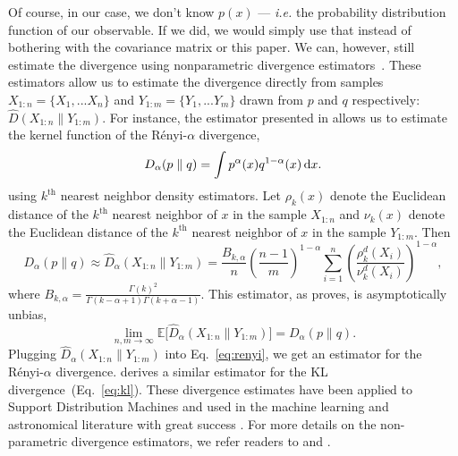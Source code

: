 \documentclass[12pt, letterpaper, preprint]{aastex}
\newcommand{\beq}{\begin{equation}}
\newcommand{\eeq}{\end{equation}}
\begin{document}
Of course, in our case, we don't know $p(x)$ --- \emph{i.e.} the probability 
distribution function of our observable. If we did, we would simply use that 
instead of bothering with the covariance matrix or this paper. We can, however, 
still estimate the divergence using nonparametric divergence estimators~\citep{wang2009, poczos2012, krishnamurthy2014}. 
These estimators allow us to estimate the divergence directly from 
samples $X_{1:n} = \{ X_1, ... X_n \}$ and $Y_{1:m} = \{ Y_1, ... Y_m \}$ 
drawn from $p$ and $q$ respectively: $\hat{D}(X_{1:n} \parallel Y_{1:m})$. 
For instance, the estimator presented in \cite{poczos2012} allows us to estimate 
the kernel function of the R\'enyi-$\alpha$ divergence,
\beq \label{eq:d_alpha}
D_{\alpha} ( p \parallel q ) = \int p^\alpha(x) q^{1-\alpha}(x)\,{\rm d}x. 
\eeq
using $k^\mathrm{th}$ nearest neighbor density estimators. Let $\rho_k(x)$ 
denote the Euclidean distance of the $k^\mathrm{th}$ nearest neighbor 
of $x$ in the sample $X_{1:n}$ and $\nu_k(x)$ denote the Euclidean distance 
of the $k^\mathrm{th}$ nearest neighbor of $x$ in the sample $Y_{1:m}$. Then 
\beq \label{eq:d_alpha_est}
D_{\alpha}(p \parallel q) \approx \hat{D}_{\alpha}(X_{1:n} \parallel Y_{1:m}) = \frac{B_{k,\alpha}}{n} \left(\frac{n-1}{m}\right)^{1-\alpha}
\sum\limits_{i=1}^{n} \left(\frac{\rho_k^{d}(X_i)}{\nu_k^{d}(X_i)} \right)^{1-\alpha},
\eeq
where $B_{k, \alpha} = \frac{\Gamma(k)^2}{\Gamma(k-\alpha+1)\Gamma(k+\alpha-1)}$. 
This estimator, as \cite{poczos2012} proves, is asymptotically unbias,
\beq
\lim_{n, m \rightarrow \infty} \mathbb{E} \big[ \hat{D}_{\alpha} (X_{1:n} \parallel Y_{1:m}) \big] = D_{\alpha} (p \parallel q).
\eeq
Plugging $\hat{D}_{\alpha}(X_{1:n} \parallel Y_{1:m})$ into Eq.~\ref{eq:renyi},
we get an estimator for the R\'enyi-$\alpha$ divergence. \cite{wang2009} derives
a similar estimator for the KL divergence~(Eq.~\ref{eq:kl}). 
These divergence estimates have been applied to Support Distribution Machines 
and used in the machine learning and astronomical literature with great success
\citep[\emph{e.g.}][]{poczos2011, poczos2012, poczos2012a, xu2013, ntampaka2015, ntampaka2016, ravanbakhsh2017a}. %
For more details on the non-parametric divergence estimators, we refer readers to 
\cite{poczos2012} and \cite{krishnamurthy2014}.
\end{document}

